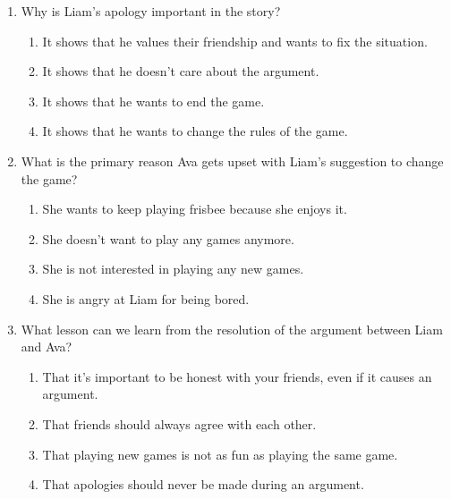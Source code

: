 \documentclass[12pt]{article}
\begin{document}
\begin{enumerate}
    \item Why is Liam’s apology important in the story?
    \begin{enumerate}[label=\Alph*.]
        \item It shows that he values their friendship and wants to fix the situation.
        \item It shows that he doesn’t care about the argument.
        \item It shows that he wants to end the game.
        \item It shows that he wants to change the rules of the game.
    \end{enumerate}
    \vspace{0.5cm}

    \item What is the primary reason Ava gets upset with Liam’s suggestion to change the game?
    \begin{enumerate}[label=\Alph*.]
        \item She wants to keep playing frisbee because she enjoys it.
        \item She doesn’t want to play any games anymore.
        \item She is not interested in playing any new games.
        \item She is angry at Liam for being bored.
    \end{enumerate}
    \vspace{0.5cm}

    \item What lesson can we learn from the resolution of the argument between Liam and Ava?
    \begin{enumerate}[label=\Alph*.]
        \item That it’s important to be honest with your friends, even if it causes an argument.
        \item That friends should always agree with each other.
        \item That playing new games is not as fun as playing the same game.
        \item That apologies should never be made during an argument.
    \end{enumerate}

\end{enumerate}
\end{document}
